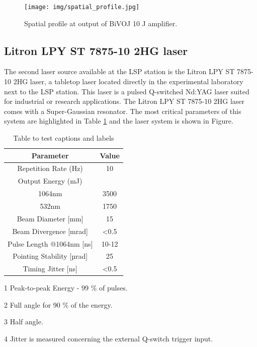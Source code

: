 \begin{figure}[h]
    \centering
    \texttt{[image: img/spatial\_profile.jpg]}
    \caption{Spatial profile at output of BiVOJ 10 J amplifier.}
    \label{fig:spatialprofile}
\end{figure}

\subsection{Litron LPY ST 7875-10 2HG laser}

The second laser source available at the LSP station is the Litron LPY ST 7875-10 2HG laser, a tabletop laser located directly in the experimental laboratory next to the LSP station. This laser is a pulsed Q-switched Nd:YAG laser suited for industrial or research applications. The Litron  LPY ST 7875-10 2HG laser comes with a Super-Gaussian resonator. The most critical parameters of this system are highlighted in Table \ref{litronparameters} and the laser system is shown in Figure. 


\begin{table}[h!]
\centering
    \begin{threeparttable}
        \begin{tabular}{||c | c||} 
        \hline
            \textbf{Parameter} & \textbf{Value} \\ [0.5ex] 
        \hline\hline
        Repetition Rate (Hz) & 10  \\ 
        \hline
            Output Energy (mJ) & \\
            1064nm & 3500 \\
            532nm & 1750 \\
        \hline
            Beam Diameter [mm] & 15 \tnote{1} \\
        \hline
            Beam Divergence [mrad] & <0.5 \tnote{2} \\ 
        \hline
            Pulse Length @1064nm [ns] & 10-12 \\
        \hline
            Pointing Stability [µrad] & 25 \tnote{3} \\
        \hline
            Timing Jitter [ns] & <0.5 \tnote{4}  \\
        \hline
        \hline
        \end{tabular}
        \begin{tablenotes}
            \small
            \item[1] Peak-to-peak Energy - 99 \% of pulses. 
            \item[2] Full angle for 90 \% of the energy.
            \item[3] Half angle.
            \item[4] Jitter is measured concerning the external Q-switch trigger input.
        \end{tablenotes}
    
        \caption{Table to test captions and labels}
        \label{litronparameters}
    \end{threeparttable}
\end{table}



